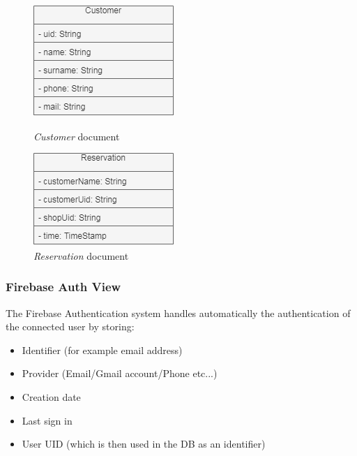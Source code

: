 \begin{figure}[H]
\begin{minipage}[b]{0.3\textwidth}
    \includegraphics[width=\textwidth]{Img/CustomerDocument}
	\caption{\emph{Customer} document}
	  \label{fig:CustomerDocument}
  \end{minipage}
  \hfill
  \begin{minipage}[b]{0.3\textwidth}
    \includegraphics[width=\textwidth]{Img/ReservationDocument}
	\caption{\emph{Reservation} document}
	  \label{fig:ReservationDocument}
  \end{minipage}
\end{figure}

\subsubsection{Firebase Auth View}
The Firebase Authentication system handles automatically the authentication of the connected user by storing:
\begin{itemize}
\item Identifier (for example email address)
\item Provider (Email/Gmail account/Phone etc...)
\item Creation date
\item Last sign in
\item User UID (which is then used in the DB as an identifier)
\end{itemize} 
